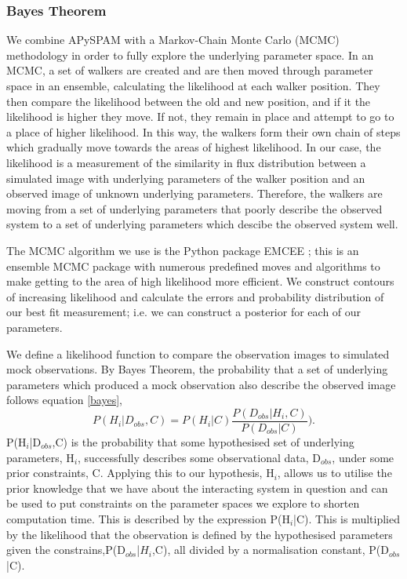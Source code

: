 \subsubsection{Bayes Theorem}
We combine APySPAM with a Markov-Chain Monte Carlo (MCMC) methodology in order to fully explore the underlying parameter space. In an MCMC, a set of walkers are created and are then moved through parameter space in an ensemble, calculating the likelihood at each walker position. They then compare the likelihood between the old and new position, and if it the likelihood is higher they move. If not, they remain in place and attempt to go to a place of higher likelihood. In this way, the walkers form their own chain of steps which gradually move towards the areas of highest likelihood. In our case, the likelihood is a measurement of the similarity in flux distribution between a simulated image with underlying parameters of the walker position and an observed image of unknown underlying parameters. Therefore, the walkers are moving from a set of underlying parameters that poorly describe the observed system to a set of underlying parameters which descibe the observed system well. 

The MCMC algorithm we use is the Python package EMCEE \citep{Foreman-Mackey_13}; this is an ensemble MCMC package with numerous predefined moves and algorithms to make getting to the area of high likelihood more efficient. We construct contours of increasing likelihood and calculate the errors and probability distribution of our best fit measurement; i.e. we can construct a posterior for each of our parameters.

We define a likelihood function to compare the observation images to simulated mock observations. By Bayes Theorem, the probability that a set of underlying parameters which produced a mock observation also describe the observed image follows equation \ref{bayes},
\begin{equation}\label{bayes}
    P(H_{i}|D_{obs},C) = P(H_{i}|C)\frac{P(D_{obs}|H_{i},C)}{P(D_{obs}|C)}).
\end{equation}
P(H$_{i}$|D$_{obs}$,C) is the probability that some hypothesised set of underlying parameters, H$_{i}$, successfully describes some observational data, D$_{obs}$, under some prior constraints, C. Applying this to our hypothesis, H$_{i}$, allows us to utilise the prior knowledge that we have about the interacting system in question and can be used to put constraints on the parameter spaces we explore to shorten computation time. This is described by the expression P(H$_{i}$|C). This is multiplied by the likelihood that the observation is defined by the hypothesised parameters given the constrains,P(D$_{obs}$|$H_{i}$,C), all divided by a normalisation constant, P(D$_{obs}$|C).

